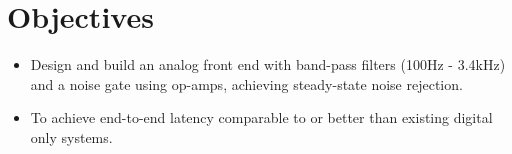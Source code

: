 \section{Objectives}
\begin{itemize}
    \item Design and build an analog front end with band-pass filters (100Hz - 3.4kHz) and a noise gate using op-amps, achieving steady-state noise rejection.
    \item To achieve end-to-end latency comparable to or better than existing digital only systems.
\end{itemize}







